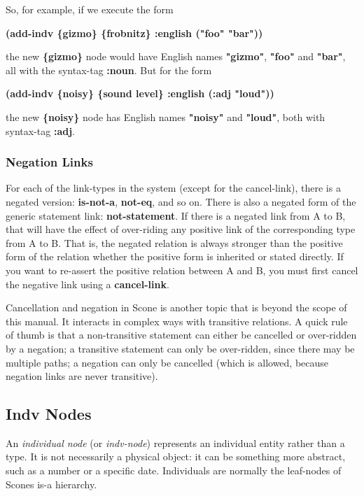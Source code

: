 \documentclass[titlepage,twoside,openright,11pt]{article}
\begin{document}
So, for example, if we execute the form

\textbf{(add-indv \{gizmo\} \{frobnitz\} :english ("foo" "bar"))}

the new \textbf{\{gizmo\}} node would have English names
\textbf{"gizmo"}, \textbf{"foo"} and \textbf{"bar"}, all with the
syntax-tag \textbf{:noun}. But for the form

\textbf{(add-indv \{noisy\} \{sound level\} :english
\textquotesingle(:adj "loud"))}

the new \textbf{\{noisy\}} node has English names \textbf{"noisy"} and
\textbf{"loud"}, both with syntax-tag \textbf{:adj}.

\subsubsection{Negation Links}\label{negation-links}

For each of the link-types in the system (except for the cancel-link),
there is a negated version: \textbf{is-not-a}, \textbf{not-eq}, and so
on. There is also a negated form of the generic statement link:
\textbf{not-statement}. If there is a negated link from A to B, that
will have the effect of over-riding any positive link of the
corresponding type from A to B. That is, the negated relation is always
stronger than the positive form of the relation whether the positive
form is inherited or stated directly. If you want to re-assert the
positive relation between A and B, you must first cancel the negative
link using a \textbf{cancel-link}.

Cancellation and negation in Scone is another topic that is beyond the
scope of this manual. It interacts in complex ways with transitive
relations. A quick rule of thumb is that a non-transitive statement can
either be cancelled or over-ridden by a negation; a transitive statement
can only be over-ridden, since there may be multiple paths; a negation
can only be cancelled (which is allowed, because negation links are
never transitive).

\subsection{Indv Nodes}\label{indv-nodes}

An \emph{individual node} (or \emph{indv-node}) represents an individual
entity rather than a type. It is not necessarily a physical object: it
can be something more abstract, such as a number or a specific date.
Individuals are normally the leaf-nodes of Scone\textquotesingle s is-a
hierarchy.
\end{document}
